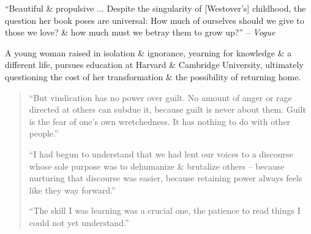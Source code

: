 \documentclass{article}
\begin{document}
\begin{enumerate}
	``Beautiful \& propulsive $\ldots$ Despite the singularity of [{\sc Westover}'s] childhood, the question her book poses are universal: How much of ourselves should we give to those we love? \& how much must we betray them to grow up?'' -- {\it Vogue}
	
	A young woman raised in isolation \& ignorance, yearning for knowledge \& a different life, pursues education at Harvard \& Cambridge University, ultimately questioning the cost of her transformation \& the possibility of returning home.
	\begin{quote}
		\item ``But vindication has no power over guilt. No amount of anger or rage directed at others can subdue it, because guilt is never about them. Guilt is the fear of one's own wretchedness. It has nothing to do with other people.''
		\item ``I had begun to understand that we had lent our voices to a discourse whose sole purpose was to dehumanize \& brutalize others -- because nurturing that discourse was easier, because retaining power always feels like they way forward.''
		\item ``The skill I was learning was a crucial one, the patience to read things I could not yet understand.''
	\end{quote}
	

\end{enumerate}
\end{document}
